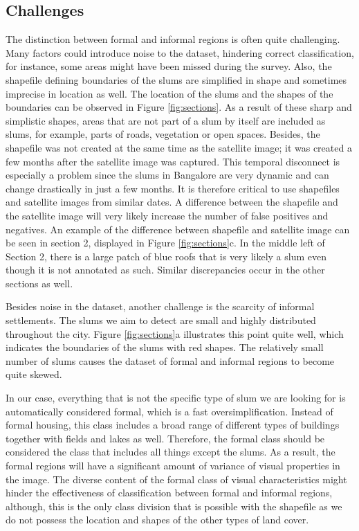 \subsection{Challenges}

The distinction between formal and informal regions is often quite challenging. Many factors could introduce noise to the dataset, hindering correct classification, for instance, some areas might have been missed during the survey. Also, the shapefile defining boundaries of the slums are simplified in shape and sometimes imprecise in location as well. The location of the slums and the shapes of the boundaries can be observed in Figure \ref{fig:sections}. As a result of these sharp and simplistic shapes,  areas that are not part of a slum by itself are included as slums, for example, parts of roads, vegetation or open spaces. Besides, the shapefile was not created at the same time as the satellite image; it was created a few months after the satellite image was captured. This temporal disconnect is especially a problem since the slums in Bangalore are very dynamic and can change drastically in just a few months. It is therefore critical to use shapefiles and satellite images from similar dates. A difference between the shapefile and the satellite image will very likely increase the number of false positives and negatives. An example of the difference between shapefile and satellite image can be seen in section 2, displayed in Figure \ref{fig:sections}c. In the middle left of Section 2, there is a large patch of blue roofs that is very likely a slum even though it is not annotated as such. Similar discrepancies occur in the other sections as well. 

Besides noise in the dataset, another challenge is the scarcity of informal settlements.  The slums we aim to detect are small and highly distributed throughout the city. Figure \ref{fig:sections}a illustrates this point quite well, which indicates the boundaries of the slums with red shapes. The relatively small number of slums causes the dataset of formal and informal regions to become quite skewed.

In our case, everything that is not the specific type of slum we are looking for is automatically considered formal, which is a fast oversimplification. Instead of formal housing, this class includes a broad range of different types of buildings together with fields and lakes as well. Therefore, the formal class should be considered the class that includes all things except the slums. As a result, the formal regions will have a significant amount of variance of visual properties in the image. The diverse content of the formal class of visual characteristics might hinder the effectiveness of classification between formal and informal regions, although, this is the only class division that is possible with the shapefile as we do not possess the location and shapes of the other types of land cover.

